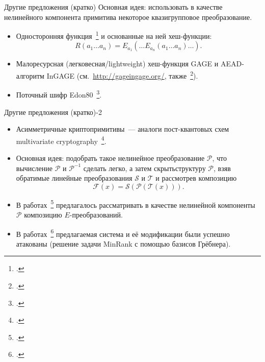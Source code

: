 \begin{frame}{Другие предложения (кратко)}
    Основная идея: использовать в качестве нелинейного компонента примитива некоторое квазигрупповое преобразование.
    \begin{itemize}
        \item  \guillemotleft Односторонняя функция\guillemotright~\footcite{gligoroski2008edon, gligoroski2009family, EdonR, EdonRprime} и основанные на ней хеш-функции:
        \begin{equation*}
            R(a_1 \ldots a_n) = E_{a_1} \left( \ldots E_{a_n}(a_1 \ldots a_n) \ldots \right).
        \end{equation*}
        \pause
        \item Малоресурсная (легковесная/lightweight) хеш-функция GAGE и AEAD-алгоритм InGAGE (см.~\url{http://gageingage.org/}, также~\footcite{otte2019gage, gligoroski2019s}).
        \pause
        \item Поточный шифр Edon80~\footcite{edon80}.
    \end{itemize}
\end{frame}


\begin{frame}{Другие предложения (кратко)-2}
    \begin{itemize}
        \item Асимметричные криптопримитивы~--- аналоги пост-квантовых схем multivariate cryptography~\footcite{preneel}.
        \pause
        \item Основная идея: подобрать такое нелинейное преобразование $\mathcal{P}$, что вычисление $\mathcal{P}$ и $\mathcal{P}^{-1}$ сделать  \guillemotleft легко\guillemotright, а затем  \guillemotleft скрыть\guillemotright структуру $\mathcal{P}$, взяв обратимые линейные преобразования $\mathcal{S}$ и $\mathcal{T}$ и рассмотрев композицию 
        \[
            \mathcal{F}(x) = \mathcal{S} \left( \mathcal{P} \left(\mathcal{T}(x) \right) \right).
        \]
        \pause 
        \item В работах~\footcite{gligoroski2008public, gligoroski2008multivariate, chen2010multivariate, gligoroski2011mqq} предлагалось рассматривать в качестве нелинейной компоненты $\mathcal{P}$ композицию $E$-преобразований.
        \pause 
        \item В работах~\footcite{mohamed2009algebraic, faugere2015polynomial} предлагаемая система и её модификации были успешно атакованы (решение задачи MinRank с помощью базисов Грёбнера).
    \end{itemize}
        
\end{frame}



